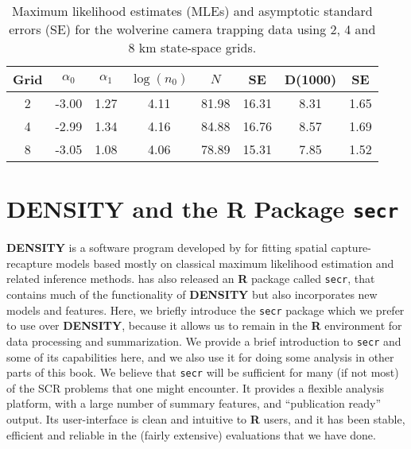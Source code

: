 \begin{table}
\centering
\caption{Maximum likelihood estimates (MLEs) and asymptotic standard
  errors (SE)  for the wolverine camera trapping data using 2, 4 and 8 km state-space grids.}
\begin{tabular}{cccccccc}
\hline \hline
Grid &  $\alpha_0$  &  $\alpha_1$ &   $\log(n_0)$  & $N$   &  SE & D(1000) &  SE \\ \hline
2  &  -3.00 & 1.27 &4.11  &81.98& 16.31 &8.31 &1.65\\
4  &  -2.99 & 1.34  &4.16 &84.88& 16.76 &8.57& 1.69\\
8   & -3.05 & 1.08 &4.06  &78.89& 15.31 &7.85& 1.52\\   \hline
\end{tabular}
\label{mle.tab.wolv}
\end{table}



\section{DENSITY and the R Package \mbox{\tt secr} }
\label{mle.sec.secr}

{\bf DENSITY} is a software program developed by \citet{efford:2004}
for fitting spatial capture-recapture models based mostly on classical
maximum likelihood estimation and related inference methods.
\citet{efford:2011} has also released an {\bf R} package called
\mbox{\tt secr}, that contains much of the functionality of {\bf
  DENSITY} but also incorporates new models and features.  Here, we
briefly introduce the \mbox{\tt secr} package which we prefer to use
over {\bf DENSITY}, because it allows us to remain in the {\bf R}
environment for data processing and summarization. We provide a brief
introduction to \mbox{\tt secr} and some of its capabilities here, and
we also use it for doing some analysis in other parts of this book. We
believe that \mbox{\tt secr} will be sufficient for many (if not most) 
of the SCR problems that one might encounter. It 
provides a flexible analysis platform, with a large number of summary
features, and ``publication ready'' output. Its user-interface is
clean and intuitive to {\bf R} users, and it has been stable,
efficient and reliable in the (fairly extensive) evaluations that we
have done. 


